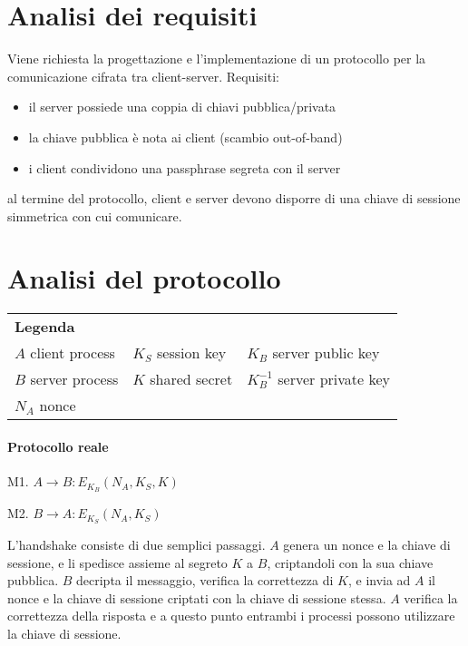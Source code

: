 \documentclass[a4paper]{article}
\title{\Title}
\author{\Author}
\date{\today}
\begin{document}
\maketitle

\section{Analisi dei requisiti}
Viene richiesta la progettazione e l'implementazione di un protocollo per la comunicazione cifrata tra client-server. Requisiti:
\begin{itemize}
\item il server possiede una coppia di chiavi pubblica/privata
\item la chiave pubblica è nota ai client (scambio out-of-band)
\item i client condividono una passphrase segreta con il server
\end{itemize}
al termine del protocollo, client e server devono disporre di una chiave di sessione simmetrica con cui comunicare.


\section{Analisi del protocollo}

\begin{tabular}{ p{4cm} p{4cm} p{4cm} }
  {\bf Legenda}\\
  $A$     client process &
  $K_S$   session key &
  $K_{B}$ server public key \\

  $B$ server process &
  $K$ shared secret &
  $K_{B}^{-1}$ server private key \\

  $N_A$ nonce 
\end{tabular}


\paragraph{Protocollo reale}
\begin{list}{}{}
\item M1. $ A \rightarrow B: E_{K_{B}}(N_A, K_S, K) $
\item M2. $ B \rightarrow A: E_{K_S}(N_A, K_S) $
\end{list}
L'handshake consiste di due semplici passaggi. $A$ genera un nonce e la chiave di sessione, e li spedisce assieme al segreto $K$ a $B$, criptandoli con la sua chiave pubblica. $B$ decripta il messaggio, verifica la correttezza di $K$, e invia ad $A$ il nonce e la chiave di sessione criptati con la chiave di sessione stessa. $A$ verifica la correttezza della risposta e a questo punto entrambi i processi possono utilizzare la chiave di sessione.
\end{document}
